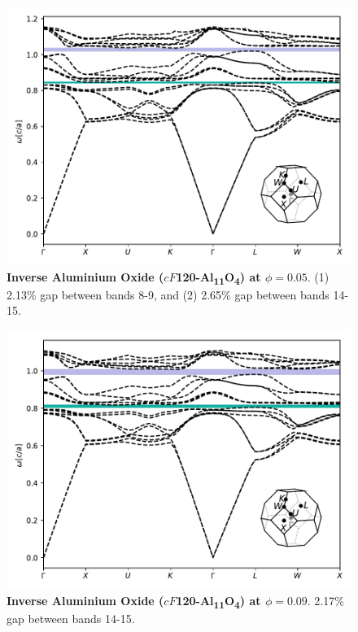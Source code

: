 \documentclass[fleqn,amsmath,amssymb,superscriptaddress, reprint,prl]{revtex4-1}
\begin{document}
\begin{figure}
\includegraphics[width=0.9\linewidth]{workspace/25fa9cece9243c002a1f7d211316b644/images/r=19.pdf}
	\caption{\textbf{Inverse Aluminium Oxide ($cF$120-Al\textsubscript{1}\textsubscript{1}O\textsubscript{4}) at $\phi=0.05$}. (1) 2.13\% gap between bands 8-9, and (2) 2.65\% gap between bands 14-15.}
\end{figure}

\begin{figure}
\includegraphics[width=0.9\linewidth]{workspace/25fa9cece9243c002a1f7d211316b644/images/r=18.pdf}
	\caption{\textbf{Inverse Aluminium Oxide ($cF$120-Al\textsubscript{1}\textsubscript{1}O\textsubscript{4}) at $\phi=0.09$}. 2.17\% gap between bands 14-15.}
\end{figure}
\end{document}
